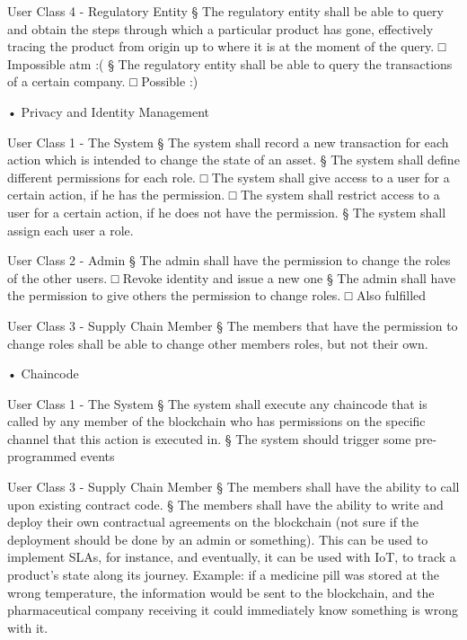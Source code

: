 {		\par User Class 4 - Regulatory Entity
			§ The regulatory entity shall be able to query and obtain the steps through which a particular product has gone, effectively tracing the product from origin up to where it is at the moment of the query.
				□ Impossible atm :(
			§  The regulatory entity shall be able to query the transactions of a certain company.
				□ Possible :)
			
		
	• Privacy and Identity Management
		\par User Class 1 - The System
			§ The system shall record a new transaction for each action which is intended to change the state of an asset.
			§ The system shall define different permissions for each role.
				□ The system shall give access to a user for a certain action, if he has the permission.
				□ The system shall restrict access to a user for a certain action, if he does not have the permission.
			§ The system shall assign each user a role.
		
		\par User Class 2 - Admin
			§ The admin shall have the permission to change the roles of the other users.
				□ Revoke identity and issue a new one
			§ The admin shall have the permission to give others the permission to change roles.
				□ Also fulfilled
		
		\par User Class 3 - Supply Chain Member
			§ The members that have the permission to change roles shall be able to change other members roles, but not their own.

	• Chaincode

		\par User Class 1 - The System
			§ The system shall execute any chaincode that is called by any member of the blockchain who has permissions on the specific channel that this action is executed in.
			§ The system should trigger some pre-programmed events
		\par User Class 3 - Supply Chain Member
			§ The members shall have the ability to call upon existing contract code.
			§ The members shall have the ability to write  and deploy their own contractual agreements on the blockchain (not sure if the deployment should be done by an admin or something). This can be used to implement SLAs, for instance, and eventually, it can be used with IoT, to track a product's state along its journey. Example: if a medicine pill was stored at the wrong temperature, the information would be sent to the blockchain, and the pharmaceutical company receiving it could immediately know something is wrong with it.
			
}
